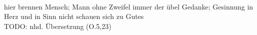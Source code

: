 \begin{exe}
\ex \label{ex:O72468} \gll {}                    \object{;} \\
{hier} {brennen} {Mensch; Mann} {ohne} {Zweifel} {immer} {der} {übel} {Gedanke; Gesinnung} {in} {Herz} {und} {in} {Sinn} {} {nicht} {schauen} {sich} {zu } {Gutes} {}\\
\glt TODO: nhd. Übersetzung (O.5,23)
\end{exe}
